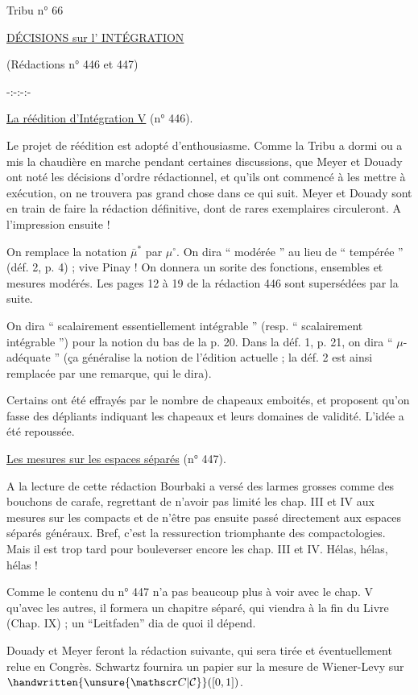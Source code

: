 Tribu n° 66

\uline{DÉCISIONS sur l' INTÉGRATION}

(Rédactions n° 446 et 447)

\mbox{-:-:-:-}

\uline{La réédition d'Intégration V} (n° 446).

Le projet de réédition est adopté d'enthousiasme. Comme la Tribu a dormi ou a mis la chaudière en marche pendant certaines discussions, que Meyer et Douady ont noté les décisions d'ordre rédactionnel, et qu'ils ont commencé à les mettre à exécution, on ne trouvera pas grand chose dans ce qui suit. Meyer et Douady sont en train de faire la rédaction définitive, dont de rares exemplaires circuleront. A l'impression ensuite !

On remplace la notation $\bar\mu^*$ par $\mu^\circ$. On dira `` modérée '' au lieu de `` tempérée '' (déf. 2, p. 4) ; vive Pinay ! On donnera un sorite des fonctions, ensembles et mesures modérés. Les pages 12 à 19 de la rédaction 446 sont supersédées par la suite.

On dira `` scalairement essentiellement intégrable '' (resp. `` scalairement intégrable '') pour la notion du bas de la p. 20. Dans la déf. 1, p. 21, on dira `` $\mu$-adéquate '' (ça généralise la notion de l'édition actuelle ; la déf. 2 est ainsi remplacée par une remarque, qui le dira).

Certains ont été effrayés par le nombre de chapeaux emboités, et proposent qu'on fasse des dépliants indiquant les chapeaux et leurs domaines de validité. L'idée a été repoussée.

\uline{Les mesures sur les espaces séparés} (n° 447).

A la lecture de cette rédaction Bourbaki a versé des larmes grosses comme des bouchons de carafe, regrettant de n'avoir pas limité les chap. III et IV aux mesures sur les compacts et de n'être pas ensuite passé directement aux espaces séparés généraux. Bref, c'est la ressurection triomphante des compactologies. Mais il est trop tard pour bouleverser encore les chap. III et IV. Hélas, hélas, hélas !

Comme le contenu du n° 447 n'a pas beaucoup plus à voir avec le chap. V qu'avec les autres, il formera un chapitre séparé, qui viendra à la fin du Livre (Chap. IX) ; un ``Leitfaden'' dia de quoi il dépend.

Douady et Meyer feront la rédaction suivante, qui sera tirée et éventuellement relue en Congrès. Schwartz fournira un papier sur la mesure de Wiener-Levy sur $\handwritten{\unsure{\mathscr C|\mathcal C}}([0,1])$.
